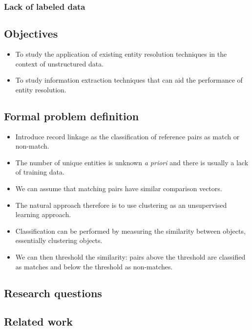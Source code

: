 \documentclass[paper=a4, fontsize=11pt]{scrartcl}
\begin{document}
\subsubsection{Lack of labeled data}

\subsection{Objectives}
\label{sec:objectives}

\begin{itemize}
	\item To study the application of existing entity resolution techniques in the context of unstructured data.
	\item To study information extraction techniques that can aid the performance of entity resolution.
\end{itemize}

\subsection{Formal problem definition}
\label{sec:formal_problem_definition}

\begin{itemize}
    \item Introduce record linkage as the classification of reference pairs as match or non-match.
    \item The number of unique entities is unknown \emph{a priori} and there is usually a lack of training data.
    \item We can assume that matching pairs have similar comparison vectors.
    \item The natural approach therefore is to use clustering as an unsupervised learning approach.
    \item Classification can be performed by measuring the similarity between objects, essentially clustering objects.
    \item We can then threshold the similarity: pairs above the threshold are classified as matches and below the threshold as non-matches.
\end{itemize}

\subsection{Research questions}
\label{sec:research_questions}

\subsection{Related work}
\label{sec:related_work}
\end{document}
